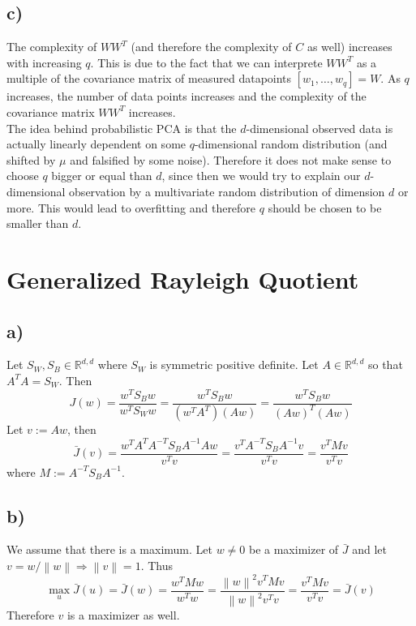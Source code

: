 \documentclass[paper=a4,fontsize=10pt,DIV11,BCOR10mm]{scrartcl}
\newcommand{\norm}[1]{\left\lVert#1\right\rVert}
\begin{document}
\subsection*{c)}
The complexity of $WW^T$ (and therefore the complexity of $C$ as well) increases with increasing $q$. This is due to the fact that we can interprete $WW^T$ as a multiple of the covariance matrix of measured datapoints $[w_1,\dots, w_q]=W$. As $q$ increases, the number of data points increases and the complexity of the covariance matrix $WW^T$ increases.\\

The idea behind probabilistic PCA is that the $d$-dimensional observed data is actually linearly dependent on some $q$-dimensional random distribution (and shifted by $\mu$ and falsified by some noise). Therefore it does not make sense to choose $q$ bigger or equal than $d$, since then we would try to explain our $d$-dimensional observation by a multivariate random distribution of dimension $d$ or more. This would lead to overfitting and therefore $q$ should be chosen to be smaller than $d$.




\section{Generalized Rayleigh Quotient}

\subsection*{a)}

Let $S_W, S_B \in \mathbb{R}^{d,d}$ where $S_W$ is symmetric positive definite. Let $A \in \mathbb{R}^{d,d}$ so that $A^T A = S_W$. Then
\[ J(w) = \frac{w^T S_B w}{w^T S_W w} = \frac{w^T S_B w}{(w^T A^T) (A w)} = \frac{w^T S_B w}{(A w)^T (A w)} \]
Let $v := A w$, then
\[ \bar{J}(v) = \frac{w^T A^T A^{-T} S_B A^{-1} A w}{v^T v} = \frac{v^T A^{-T} S_B A^{-1} v}{v^T v} = \frac{v^T M v}{v^T v} \]
where $M := A^{-T} S_B A^{-1}$.



\subsection*{b)}

We assume that there is a maximum. Let $w \neq 0$ be a maximizer of $\bar{J}$ and let $v = w / \norm{w} \Rightarrow \norm{v} = 1$. Thus
\[ \max_u \bar{J}(u) = \bar{J}(w) = \frac{w^T M w}{w^T w} = \frac{\norm{w}^2 v^T M v}{\norm{w}^2 v^T v} = \frac{v^T M v}{v^T v} = \bar{J}(v) \]
Therefore $v$ is a maximizer as well.
\end{document}
